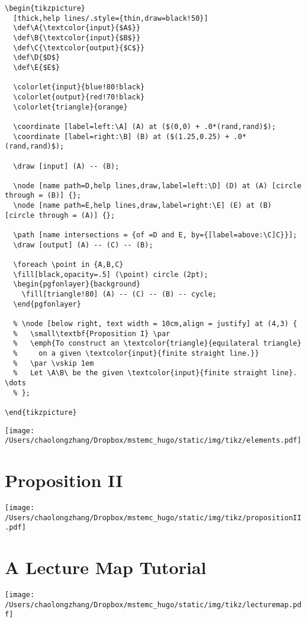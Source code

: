\documentclass[koma,a4paper,utopia,12pt,listings-color,microtype,paralist,colorlinks,urlcolor=red]{org-article}
\begin{document}
\begin{lstlisting}
\begin{tikzpicture}
  [thick,help lines/.style={thin,draw=black!50}]
  \def\A{\textcolor{input}{$A$}}
  \def\B{\textcolor{input}{$B$}}
  \def\C{\textcolor{output}{$C$}}
  \def\D{$D$}
  \def\E{$E$}

  \colorlet{input}{blue!80!black}
  \colorlet{output}{red!70!black}
  \colorlet{triangle}{orange}

  \coordinate [label=left:\A] (A) at ($(0,0) + .0*(rand,rand)$);
  \coordinate [label=right:\B] (B) at ($(1.25,0.25) + .0*(rand,rand)$);

  \draw [input] (A) -- (B);

  \node [name path=D,help lines,draw,label=left:\D] (D) at (A) [circle through = (B)] {};
  \node [name path=E,help lines,draw,label=right:\E] (E) at (B) [circle through = (A)] {};

  \path [name intersections = {of =D and E, by={[label=above:\C]C}}];
  \draw [output] (A) -- (C) -- (B);

  \foreach \point in {A,B,C}
  \fill[black,opacity=.5] (\point) circle (2pt);
  \begin{pgfonlayer}{background}
    \fill[triangle!80] (A) -- (C) -- (B) -- cycle;
  \end{pgfonlayer}

  % \node [below right, text width = 10cm,align = justify] at (4,3) {
  %   \small\textbf{Proposition I} \par
  %   \emph{To construct an \textcolor{triangle}{equilateral triangle}
  %     on a given \textcolor{input}{finite straight line.}}
  %   \par \vskip 1em
  %   Let \A\B\ be the given \textcolor{input}{finite straight line}. \dots
  % };

\end{tikzpicture}
\end{lstlisting}



\begin{center}
\texttt{[image: /Users/chaolongzhang/Dropbox/mstemc\_hugo/static/img/tikz/elements.pdf]}
\end{center}
\section{Proposition II}
\label{sec:org3b99d67}


\begin{center}
\texttt{[image: /Users/chaolongzhang/Dropbox/mstemc\_hugo/static/img/tikz/propositionII.pdf]}
\end{center}
\section{A Lecture Map Tutorial}
\label{sec:orgfae8e2b}


\begin{center}
\texttt{[image: /Users/chaolongzhang/Dropbox/mstemc\_hugo/static/img/tikz/lecturemap.pdf]}
\end{center}
\end{document}
